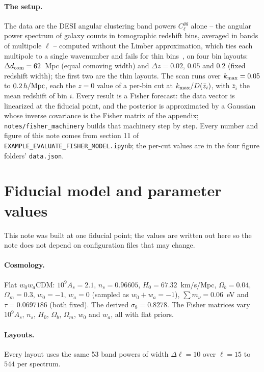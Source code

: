 \documentclass[11pt]{article}
\newcommand{\kmax}{k_{\rm max}}
\newcommand{\hMpc}{\,h/{\rm Mpc}}
\newcommand{\dcom}{$\Delta d_{\rm com} = 62$~Mpc}
\newcommand{\us}{\_\allowbreak}
\begin{document}
\paragraph{The setup.}
The data are the DESI angular clustering band powers $C_\ell^{gg}$
alone -- the angular power spectrum of galaxy counts in tomographic
redshift bins, averaged in bands of multipole $\ell$ -- computed
without the Limber approximation, which ties each multipole to a
single wavenumber and fails for thin bins~\cite{FangKEM2020}, on four
bin layouts:
\dcom{} (equal comoving width) and $\Delta z = 0.02$, $0.05$ and $0.2$
(fixed redshift width); the first two are the thin layouts.  The scan
runs over $\kmax = 0.05$ to $0.2\hMpc$, each the $z = 0$ value of a
per-bin cut at $\kmax/D(\bar{z}_i)$, with $\bar{z}_i$ the mean redshift
of bin $i$.  Every result is a Fisher forecast: the data vector is
linearized at the fiducial point, and the posterior is approximated by
a Gaussian whose inverse covariance is the Fisher matrix of the
appendix; \texttt{notes/fisher\us machinery} builds that machinery
step by step.  Every number and figure of this note comes from section 11
of \texttt{EXAMPLE\us EVALUATE\us FISHER\us MODEL.ipynb}; the per-cut
values are in the four figure folders' \texttt{data.json}.

\section{Fiducial model and parameter values}
\label{sec:fiducial}

This note was built at one fiducial point; the values are written out
here so the note does not depend on configuration files that may change.

\paragraph{Cosmology.}
Flat $w_0 w_a$CDM: $10^9 A_s = 2.1$, $n_s = 0.96605$,
$H_0 = 67.32$~km/s/Mpc, $\Omega_b = 0.04$, $\Omega_m = 0.3$,
$w_0 = -1$, $w_a = 0$ (sampled as $w_0 + w_a = -1$),
$\sum m_\nu = 0.06$~eV and $\tau = 0.0697186$ (both fixed).  The
derived $\sigma_8 = 0.8278$.  The Fisher matrices vary $10^9 A_s$,
$n_s$, $H_0$, $\Omega_b$, $\Omega_m$, $w_0$ and $w_a$, all with flat
priors.

\paragraph{Layouts.}
Every layout uses the same 53 band powers of width $\Delta\ell = 10$
over $\ell = 15$ to $544$ per spectrum.
\end{document}
